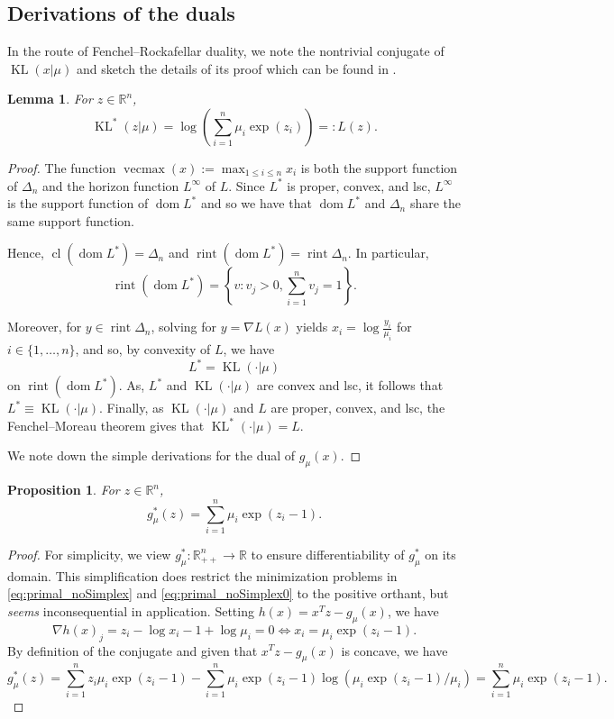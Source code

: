 \documentclass[10pt,a4paper]{article}
\numberwithin{equation}{section}
\newtheorem{proposition}[theorem]{Proposition}
\newtheorem{lemma}[theorem]{Lemma}
\theoremstyle{definition}
\def\rr{{\mathbb R}}
\DeclareMathOperator{\cl}{cl}
\DeclareMathOperator{\rint}{rint}
\DeclareMathOperator{\vecmax}{vecmax}
\DeclareMathOperator{\dom}{dom}
\DeclareMathOperator{\KL}{KL}
\begin{document}
\subsection{Derivations of the duals}

In the route of Fenchel--Rockafellar duality, we note the nontrivial conjugate of $ \KL(x| \mu)$ and sketch the details of its proof which can be found in \cite[Example 11.12]{RockWets98}.

\begin{lemma}\label{lem:KL_dual}
  For $z \in \rr^n$,
  \[
   \KL^\ast(z| \mu) = \log \left(\sum_{i=1}^n \mu_i \exp(z_i)\right) =: L(z).
  \]
\end{lemma}
\begin{proof}
   The function $\vecmax(x) := \max_{1 \leq i \leq n}x_i$ is both the support function of $\Delta_n$ and the horizon function $L^\infty$ of $L$. Since $L^\ast$ is proper, convex, and lsc, $L^\infty$ is the support function of $\dom L^\ast$ and so we have that $\dom L^\ast$ and $\Delta_n$ share the same support function. 

    Hence, $\cl(\dom L^\ast) = \Delta_n$ and $\rint (\dom L^\ast) = \rint \Delta_n$. In particular, 
    \[
        \rint (\dom L^\ast) = \left\{v : v_j > 0, \sum_{i=1}^n v_j = 1 \right\}.
    \]

    Moreover, for $y \in \rint \Delta_n$, solving for $y = \nabla L(x)$ yields $x_i = \log \frac{y_i}{\mu_i}$ for $i \in \{1, \dots, n\}$, and so, by convexity of $L$, we have 
    \[
    L^\ast = \KL(\cdot | \mu)
    \]
    on $\rint (\dom L^\ast)$. As, $L^\ast$ and $\KL(\cdot | \mu)$ are convex and lsc, it follows that $L^\ast \equiv \KL(\cdot | \mu)$. Finally, as $\KL(\cdot | \mu)$ and $L$ are proper, convex, and lsc, the Fenchel--Moreau theorem gives that $\KL^\ast(\cdot | \mu) = L$.


    We note down the simple derivations for the dual of $g_\mu(x)$.
\end{proof}

\begin{proposition}
    For $z \in \rr^n$, 
    \[
    g_\mu^{\ast}(z) = \sum_{i=1}^n \mu_i \exp(z_i - 1).
    \]
\end{proposition}
\begin{proof}
    For simplicity, we view $g_\mu^{\ast}: \rr^n_{++} \to \rr$ to ensure differentiability of $g_\mu^{\ast}$ on its domain. This simplification does restrict the minimization problems in \eqref{eq:primal_noSimplex} and \eqref{eq:primal_noSimplex0} to the positive orthant, but \emph{seems} inconsequential in application. Setting $h(x) = x^Tz - g_\mu(x)$, we have
    \[
    \nabla h(x)_j = z_i - \log x_i - 1 + \log \mu_i = 0 \iff x_i = \mu_i \exp(z_i -1).
    \]
    By definition of the conjugate and given that $x^Tz - g_\mu(x)$ is concave, we have 
    \[
     g_\mu^{\ast}(z) = \sum_{i=1}^n z_i  \mu_i \exp(z_i -1) - \sum_{i=1}^n \mu_i \exp(z_i -1) \log(\mu_i \exp(z_i -1) / \mu_i) = \sum_{i=1}^n \mu_i \exp(z_i - 1).
    \]
\end{proof}
\end{document}
